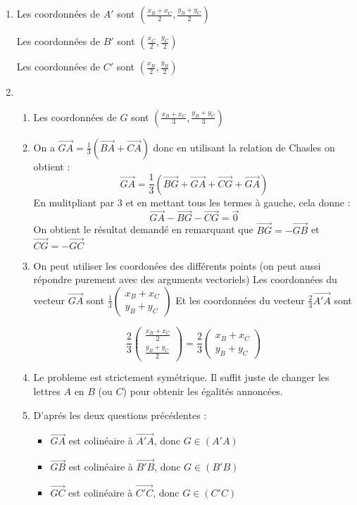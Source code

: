 \documentclass[a4paper, 11pt,reqno]{article}
\newcommand\vv[1]{\overrightarrow{#1}}
\begin{document}
\begin{correction}
\begin{enumerate}
\item Les coordonnées de $A'$ sont $(\frac{x_B+x_C}{2} , \frac{y_B+y_C}{2})$

Les coordonnées de $B'$ sont $(\frac{x_C}{2} , \frac{y_C}{2})$

Les coordonnées de $C'$ sont $(\frac{x_B}{2} , \frac{y_B}{2})$

\item \begin{enumerate}
\item Les coordonnées de $G$ sont $ \left( \frac{x_B+x_C}{3}, \frac{y_B+y_C}{3}\right)$
\item On a $\vv{GA}=\frac{1}{3}( \vv{BA} +\vv{CA})$ donc en utilisant la relation de Chasles on obtient : 
$$\vv{GA}  =\frac{1}{3}( \vv{BG}+\vv{GA} +\vv{CG}+\vv{GA})$$
En mulitpliant par 3 et en mettant tous les termes à gauche, cela donne : 
$$\vv{GA} - \vv{BG} -\vv{CG}=\vv{0}$$
On obtient le résultat demandé en remarquant que $\vv{BG}=-\vv{GB}$ et $\vv{CG}=-\vv{GC}$


\item On peut utiliser les coordonées des différents points (on peut aussi répondre purement avec des arguments vectoriels) 
Les coordonnées du vecteur $\vv{GA}$ sont $\frac{1}{3}\begin{pmatrix}
x_B+x_C\\
y_B+y_C
\end{pmatrix}$
Et les coordonnées du vecteur $\frac{2}{3}\vv{A'A}$ sont 

$$\frac{2}{3}\begin{pmatrix}
\frac{x_B+x_C}{2} \\
\frac{y_B+y_C}{2}
\end{pmatrix} = \frac{2}{3}\begin{pmatrix}
x_B+x_C \\
y_B+y_C
\end{pmatrix} $$

\conclusion{Ainsi $\vv{GA} = \frac{2}{3}\vv{A'A}$}

\item Le probleme est strictement symétrique. Il suffit juste de changer les lettres $A$ en $B$ (ou $C$)  pour obtenir les égalités annoncées. 

\item D'aprés les deux questions précédentes :
\begin{itemize}
\item $\vv{GA}$ est colinéaire à $\vv{A'A}$, donc $ G\in (A'A)$
\item $\vv{GB}$ est colinéaire à $\vv{B'B}$, donc $G \in (B'B)$
\item $\vv{GC}$ est colinéaire à $\vv{C'C}$, donc $G \in (C'C)$
\end{itemize} 


\end{enumerate}
\end{enumerate}
\end{correction}
\end{document}
